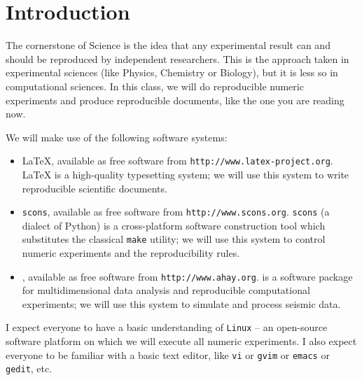 \section{Introduction}

The cornerstone of Science is the idea that any experimental result
can and should be reproduced by independent researchers. This is the
approach taken in experimental sciences (like Physics, Chemistry or
Biology), but it is less so in computational sciences. In this class,
we will do reproducible numeric experiments and produce reproducible
documents, like the one you are reading now.

We will make use of the following software systems:
\begin{itemize}

\item \LaTeX, available as free software from
  \texttt{http://www.latex-project.org}.  LaTeX is a high-quality
  typesetting system; we will use this system to write reproducible
  scientific documents.

\item \texttt{scons}, available as free software from
  \texttt{http://www.scons.org}.  \texttt{scons} (a dialect of Python)
  is a cross-platform software construction tool which substitutes the
  classical \texttt{make} utility; we will use this system to control
  numeric experiments and the reproducibility rules.

\item \mg, available as free software from
  \texttt{http://www.ahay.org}.  \mg is a software package for
  multidimensional data analysis and reproducible computational
  experiments; we will use this system to simulate and process seismic
  data.

\end{itemize}
I expect everyone to have a basic understanding of \texttt{Linux} --
an open-source software platform on which we will execute all numeric
experiments. I also expect everyone to be familiar with a basic text
editor, like \texttt{vi} or \texttt{gvim} or \texttt{emacs} or
\texttt{gedit}, etc.

